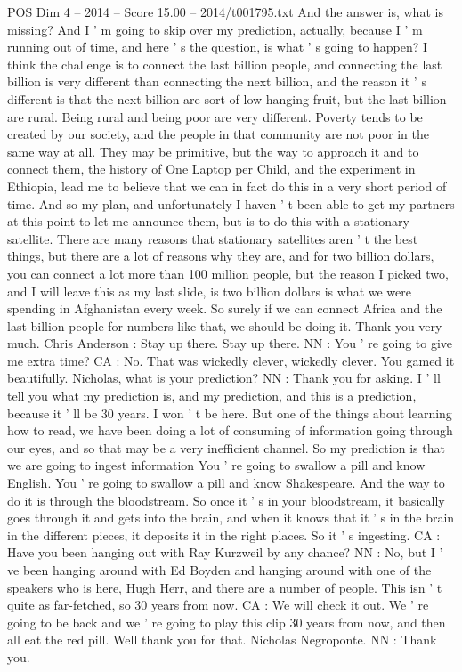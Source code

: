 \begin{textsample}{POS Dim 4 – 2014 – Score 15.00 – 2014/t001795.txt}
And the answer is, what is missing?
And I ' m going to skip over my prediction, actually, because I ' m running out of time, and here ' s the question, is what ' s going to happen?
I think the challenge is to connect the last billion people, and connecting the last billion is very different than connecting the next billion, and the reason it ' s different is that the next billion are sort of low-hanging fruit, but the last billion are rural.
Being rural and being poor are very different.
Poverty tends to be created by our society, and the people in that community are not poor in the same way at all.
They may be primitive, but the way to approach it and to connect them, the history of One Laptop per Child, and the experiment in Ethiopia, lead me to believe that we can in fact do this in a very short period of time.
And so my plan, and unfortunately I haven ' t been able to get my partners at this point to let me announce them, but is to do this with a stationary satellite.
There are many reasons that stationary satellites aren ' t the best things, but there are a lot of reasons why they are, and for two billion dollars, you can connect a lot more than 100 million people, but the reason I picked two, and I will leave this as my last slide, is two billion dollars is what we were spending in Afghanistan every week.
So surely if we can connect Africa and the last billion people for numbers like that, we should be doing it.
Thank you very much.
Chris Anderson : Stay up there.
Stay up there.
NN : You ' re going to give me extra time?
CA : No.
That was wickedly clever, wickedly clever.
You gamed it beautifully.
Nicholas, what is your prediction?
NN : Thank you for asking.
I ' ll tell you what my prediction is, and my prediction, and this is a prediction, because it ' ll be 30 years.
I won ' t be here.
But one of the things about learning how to read, we have been doing a lot of consuming of information going through our eyes, and so that may be a very inefficient channel.
So my prediction is that we are going to ingest information You ' re going to swallow a pill and know English.
You ' re going to swallow a pill and know Shakespeare.
And the way to do it is through the bloodstream.
So once it ' s in your bloodstream, it basically goes through it and gets into the brain, and when it knows that it ' s in the brain in the different pieces, it deposits it in the right places.
So it ' s ingesting.
CA : Have you been hanging out with Ray Kurzweil by any chance?
NN : No, but I ' ve been hanging around with Ed Boyden and hanging around with one of the speakers who is here, Hugh Herr, and there are a number of people.
This isn ' t quite as far-fetched, so 30 years from now.
CA : We will check it out.
We ' re going to be back and we ' re going to play this clip 30 years from now, and then all eat the red pill.
Well thank you for that.
Nicholas Negroponte.
NN : Thank you.

\end{textsample}
